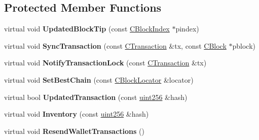 \subsection*{Protected Member Functions}
\begin{DoxyCompactItemize}
\item 
\mbox{\label{class_c_validation_interface_a8cb5e5926b2dbbb25eba8263a6a20542}} 
virtual void {\bfseries Updated\+Block\+Tip} (const \mbox{\hyperlink{class_c_block_index}{C\+Block\+Index}} $\ast$pindex)
\item 
\mbox{\label{class_c_validation_interface_a1d255ed08bf26dbd6ad5924cabfdfae4}} 
virtual void {\bfseries Sync\+Transaction} (const \mbox{\hyperlink{class_c_transaction}{C\+Transaction}} \&tx, const \mbox{\hyperlink{class_c_block}{C\+Block}} $\ast$pblock)
\item 
\mbox{\label{class_c_validation_interface_a74ce653047d4f353983908568a3a6ae5}} 
virtual void {\bfseries Notify\+Transaction\+Lock} (const \mbox{\hyperlink{class_c_transaction}{C\+Transaction}} \&tx)
\item 
\mbox{\label{class_c_validation_interface_a8684492d9878120ce8c6c760a790f9ea}} 
virtual void {\bfseries Set\+Best\+Chain} (const \mbox{\hyperlink{struct_c_block_locator}{C\+Block\+Locator}} \&locator)
\item 
\mbox{\label{class_c_validation_interface_a3b79f4ea5b0d0768ad90905d1be1353d}} 
virtual bool {\bfseries Updated\+Transaction} (const \mbox{\hyperlink{classuint256}{uint256}} \&hash)
\item 
\mbox{\label{class_c_validation_interface_a981f5160a2370db0cd616c00d8bd5270}} 
virtual void {\bfseries Inventory} (const \mbox{\hyperlink{classuint256}{uint256}} \&hash)
\item 
\mbox{\label{class_c_validation_interface_a631fa5109dcba495d7d7e86cc362bf6f}} 
virtual void {\bfseries Resend\+Wallet\+Transactions} ()
\item 
\mbox{\label{class_c_validation_interface_aeb34ef6814685cabc29062ed7be25441}} 

\end{DoxyCompactItemize}
